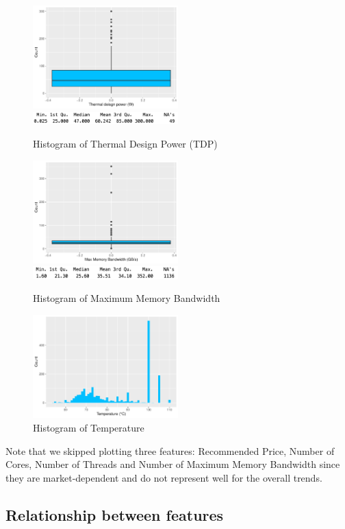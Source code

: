 \begin{figure}[h!]
    \centering
    \includegraphics[width=0.5\textwidth]{./graphics/box_tdp.pdf}
    \includegraphics[width=0.5\textwidth]{./graphics/sum_tdp.png}
    \caption{Histogram of Thermal Design Power (TDP)}
\end{figure}

\begin{figure}[h!]
    \centering
    \includegraphics[width=0.5\textwidth]{./graphics/box_memband.pdf}
    \includegraphics[width=0.5\textwidth]{./graphics/sum_memband.png}
    \caption{Histogram of Maximum Memory Bandwidth}
\end{figure}

\begin{figure}[h!]
    \centering
    \includegraphics[width=0.5\textwidth]{./graphics/hist_temp.pdf}
    \caption{Histogram of Temperature}
\end{figure}


Note that we skipped plotting three features: Recommended Price, Number of Cores, Number of Threads and Number of Maximum Memory Bandwidth
since they are market-dependent and do not represent well for the overall trends.









\subsection{Relationship between features}